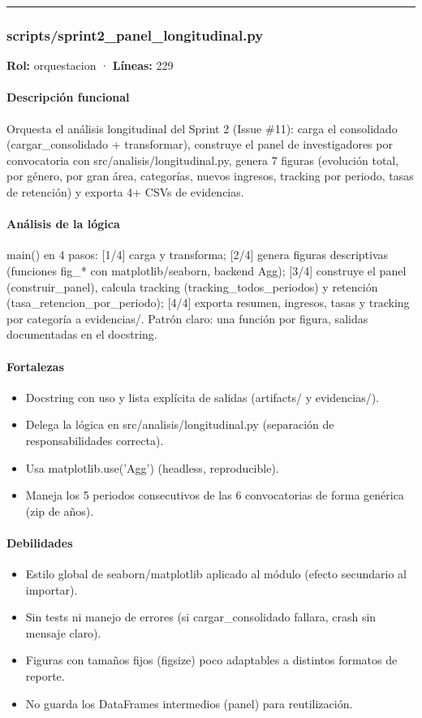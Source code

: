 \medskip
\hrule

\subsubsection{scripts/sprint2\_panel\_longitudinal.py}
\textbf{Rol:} orquestacion · \textbf{Líneas:} 229

\paragraph{Descripción funcional}
Orquesta el análisis longitudinal del Sprint 2 (Issue \#11): carga el consolidado (cargar\_consolidado + transformar), construye el panel de investigadores por convocatoria con src/analisis/longitudinal.py, genera 7 figuras (evolución total, por género, por gran área, categorías, nuevos ingresos, tracking por periodo, tasas de retención) y exporta 4+ CSVs de evidencias.

\paragraph{Análisis de la lógica}
main() en 4 pasos: [1/4] carga y transforma; [2/4] genera figuras descriptivas (funciones fig\_* con matplotlib/seaborn, backend Agg); [3/4] construye el panel (construir\_panel), calcula tracking (tracking\_todos\_periodos) y retención (tasa\_retencion\_por\_periodo); [4/4] exporta resumen, ingresos, tasas y tracking por categoría a evidencias/. Patrón claro: una función por figura, salidas documentadas en el docstring.

\paragraph{Fortalezas}
\begin{itemize}
  \item Docstring con uso y lista explícita de salidas (artifacts/ y evidencias/).
  \item Delega la lógica en src/analisis/longitudinal.py (separación de responsabilidades correcta).
  \item Usa matplotlib.use('Agg') (headless, reproducible).
  \item Maneja los 5 periodos consecutivos de las 6 convocatorias de forma genérica (zip de años).
\end{itemize}

\paragraph{Debilidades}
\begin{itemize}
  \item Estilo global de seaborn/matplotlib aplicado al módulo (efecto secundario al importar).
  \item Sin tests ni manejo de errores (si cargar\_consolidado fallara, crash sin mensaje claro).
  \item Figuras con tamaños fijos (figsize) poco adaptables a distintos formatos de reporte.
  \item No guarda los DataFrames intermedios (panel) para reutilización.
\end{itemize}

